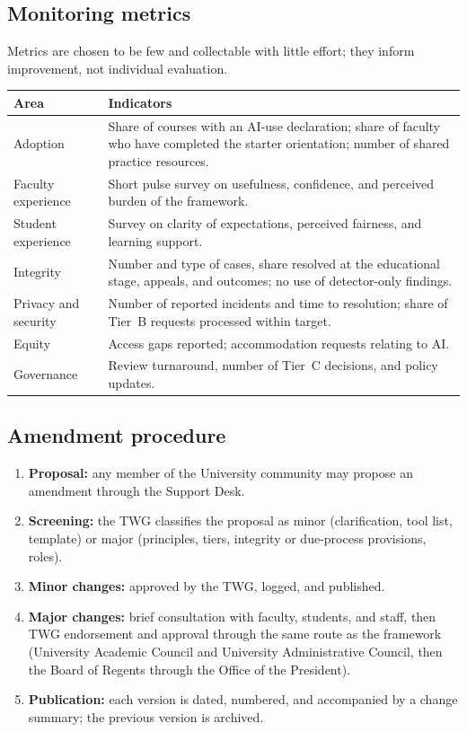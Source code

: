 \subsection{Monitoring metrics}
Metrics are chosen to be few and collectable with little effort; they inform improvement, not individual evaluation.
\begin{table}[ht]
\centering
\small
\begin{tabular}{@{}p{4.5cm}p{10.5cm}@{}}
\toprule
Area & Indicators \\
\midrule
Adoption & Share of courses with an AI-use declaration; share of faculty who have completed the starter orientation; number of shared practice resources. \\
Faculty experience & Short pulse survey on usefulness, confidence, and perceived burden of the framework. \\
Student experience & Survey on clarity of expectations, perceived fairness, and learning support. \\
Integrity & Number and type of cases, share resolved at the educational stage, appeals, and outcomes; no use of detector-only findings. \\
Privacy and security & Number of reported incidents and time to resolution; share of Tier~B requests processed within target. \\
Equity & Access gaps reported; accommodation requests relating to AI. \\
Governance & Review turnaround, number of Tier~C decisions, and policy updates. \\
\bottomrule
\end{tabular}
\end{table}

\subsection{Amendment procedure}\label{sec:amendment}
\begin{enumerate}
  \item \textbf{Proposal:} any member of the University community may propose an amendment through the Support Desk.
  \item \textbf{Screening:} the TWG classifies the proposal as minor (clarification, tool list, template) or major (principles, tiers, integrity or due-process provisions, roles).
  \item \textbf{Minor changes:} approved by the TWG, logged, and published.
  \item \textbf{Major changes:} brief consultation with faculty, students, and staff, then TWG endorsement and approval through the same route as the framework (University Academic Council and University Administrative Council, then the Board of Regents through the Office of the President).
  \item \textbf{Publication:} each version is dated, numbered, and accompanied by a change summary; the previous version is archived.
\end{enumerate}

